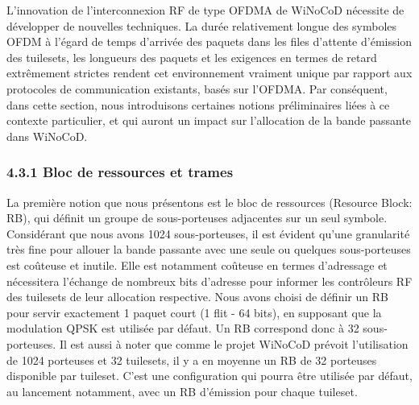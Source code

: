 L’innovation de l'interconnexion RF de type OFDMA de WiNoCoD nécessite de développer de nouvelles techniques. La durée relativement longue des symboles OFDM à l'égard de temps d'arrivée des paquets dans les files d’attente d’émission des tuilesets, les longueurs des paquets et les exigences en termes de retard extrêmement strictes rendent cet environnement vraiment unique par rapport aux protocoles de communication existants, basés sur l’OFDMA. Par conséquent, dans cette section, nous introduisons certaines notions préliminaires liées à ce contexte particulier, et qui auront un impact sur l'allocation de la bande passante dans WiNoCoD.

\subsubsection*{4.3.1 Bloc de ressources et trames}

La première notion que nous présentons est le bloc de ressources (Resource Block: RB), qui définit un groupe de sous-porteuses adjacentes sur un seul symbole. Considérant que nous avons 1024 sous-porteuses, il est évident qu’une granularité très fine pour allouer la bande passante avec une seule ou quelques sous-porteuses est coûteuse et inutile. Elle est notamment coûteuse en termes d’adressage et nécessitera l’échange de nombreux bits d’adresse pour informer les contrôleurs RF des tuilesets de leur allocation respective. Nous avons choisi de définir un RB pour servir exactement 1 paquet court (1 flit - 64 bits), en supposant que la modulation QPSK est utilisée par défaut. Un RB correspond donc à 32 sous-porteuses. Il est aussi à noter que comme le projet WiNoCoD prévoit l’utilisation de 1024 porteuses et 32 tuilesets, il y a en moyenne un RB de 32 porteuses disponible par tuileset. C’est une configuration qui pourra être utilisée par défaut, au lancement notamment, avec un RB d’émission pour chaque tuileset. 

